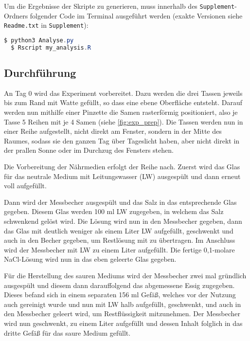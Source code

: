     Um die Ergebnisse der Skripte zu generieren, muss innerhalb des \texttt{Supplement}-Ordners folgender Code im Terminal ausgeführt werden (exakte Versionen siehe \texttt{Readme.txt} in \texttt{Supplement}):
    \begin{lstlisting}[language=Java, basicstyle=\ttfamily\color{white}, backgroundcolor=\color{black}]
  $ python3 Analyse.py
  $ Rscript my_analysis.R
    \end{lstlisting}

    \newpage
    \subsection{Durchführung} %
        \label{sub:durchführung}
        An Tag 0 wird das Experiment vorbereitet. Dazu werden die drei Tassen jeweils bis zum Rand mit Watte gefüllt, so dass eine ebene Oberfläche entsteht. Darauf werden nun mithilfe einer Pinzette die Samen rasterförmig positioniert, also je Tasse 5 Reihen mit je 4 Samen (siehe \autoref{fig:exp_prep}). Die Tassen werden nun in einer Reihe aufgestellt, nicht direkt am Fenster, sondern in der Mitte des Raumes, sodass sie den ganzen Tag über Tageslicht haben, aber nicht direkt in der prallen Sonne oder im Durchzug des Fensters stehen.

        Die Vorbereitung der Nährmedien erfolgt der Reihe nach. Zuerst wird das Glas für das neutrale Medium mit Leitungswasser (LW) ausgespült und dann erneut voll aufgefüllt.

        Dann wird der Messbecher ausgespült und das Salz in das entsprechende Glas gegeben. Diesem Glas werden 100 ml LW zugegeben, in welchem das Salz schwenkend gelöst wird. Die Lösung wird nun in den Messbecher gegeben, dann das Glas mit deutlich weniger als einem Liter LW aufgefüllt, geschwenkt und auch in den Becher gegeben, um Restlösung mit zu übertragen. Im Anschluss wird der Messbecher mit LW zu einem Liter aufgefüllt. Die fertige 0,1-molare NaCl-Lösung wird nun in das eben geleerte Glas gegeben.

        Für die Herstellung des sauren Mediums wird der Messbecher zwei mal gründlich ausgespült und diesem dann darauffolgend das abgemessene Essig zugegeben. Dieses befand sich in einem separaten 156 ml Gefäß, welches vor der Nutzung auch gereinigt wurde und nun mit LW halb aufgefüllt, geschwenkt, und auch in den Messbecher geleert wird, um Restflüssigkeit mitzunehmen. Der Messbecher wird nun geschwenkt, zu einem Liter aufgefüllt und dessen Inhalt folglich in das dritte Gefäß für das saure Medium gefüllt.

